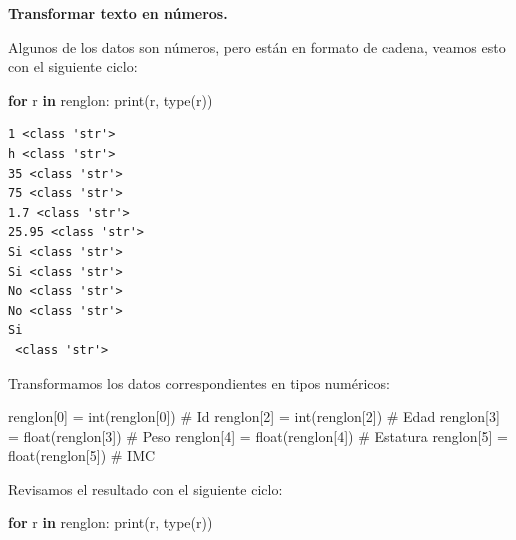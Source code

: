\documentclass[
  spanish,
  letterpaper,
]{scrbook}
\newenvironment{Shaded}{\begin{snugshade}}{\end{snugshade}}
\newcommand{\BuiltInTok}[1]{\textcolor[rgb]{0.00,0.23,0.31}{#1}}
\newcommand{\CommentTok}[1]{\textcolor[rgb]{0.37,0.37,0.37}{#1}}
\newcommand{\ControlFlowTok}[1]{\textcolor[rgb]{0.00,0.23,0.31}{\textbf{#1}}}
\newcommand{\DecValTok}[1]{\textcolor[rgb]{0.68,0.00,0.00}{#1}}
\newcommand{\KeywordTok}[1]{\textcolor[rgb]{0.00,0.23,0.31}{\textbf{#1}}}
\newcommand{\NormalTok}[1]{\textcolor[rgb]{0.00,0.23,0.31}{#1}}
\newcommand{\OperatorTok}[1]{\textcolor[rgb]{0.37,0.37,0.37}{#1}}
\theoremstyle{definition}
\theoremstyle{remark}
\begin{document}
\textbf{Transformar texto en números.}

Algunos de los datos son números, pero están en formato de cadena,
veamos esto con el siguiente ciclo:

\begin{Shaded}
\begin{Highlighting}[]
\ControlFlowTok{for}\NormalTok{ r }\KeywordTok{in}\NormalTok{ renglon:}
    \BuiltInTok{print}\NormalTok{(r, }\BuiltInTok{type}\NormalTok{(r))}
\end{Highlighting}
\end{Shaded}

\begin{verbatim}
1 <class 'str'>
h <class 'str'>
35 <class 'str'>
75 <class 'str'>
1.7 <class 'str'>
25.95 <class 'str'>
Si <class 'str'>
Si <class 'str'>
No <class 'str'>
No <class 'str'>
Si
 <class 'str'>
\end{verbatim}

Transformamos los datos correspondientes en tipos numéricos:

\begin{Shaded}
\begin{Highlighting}[]
\NormalTok{renglon[}\DecValTok{0}\NormalTok{] }\OperatorTok{=} \BuiltInTok{int}\NormalTok{(renglon[}\DecValTok{0}\NormalTok{])   }\CommentTok{\# Id}
\NormalTok{renglon[}\DecValTok{2}\NormalTok{] }\OperatorTok{=} \BuiltInTok{int}\NormalTok{(renglon[}\DecValTok{2}\NormalTok{])   }\CommentTok{\# Edad}
\NormalTok{renglon[}\DecValTok{3}\NormalTok{] }\OperatorTok{=} \BuiltInTok{float}\NormalTok{(renglon[}\DecValTok{3}\NormalTok{]) }\CommentTok{\# Peso}
\NormalTok{renglon[}\DecValTok{4}\NormalTok{] }\OperatorTok{=} \BuiltInTok{float}\NormalTok{(renglon[}\DecValTok{4}\NormalTok{]) }\CommentTok{\# Estatura}
\NormalTok{renglon[}\DecValTok{5}\NormalTok{] }\OperatorTok{=} \BuiltInTok{float}\NormalTok{(renglon[}\DecValTok{5}\NormalTok{]) }\CommentTok{\# IMC}
\end{Highlighting}
\end{Shaded}

Revisamos el resultado con el siguiente ciclo:

\begin{Shaded}
\begin{Highlighting}[]
\ControlFlowTok{for}\NormalTok{ r }\KeywordTok{in}\NormalTok{ renglon:}
    \BuiltInTok{print}\NormalTok{(r, }\BuiltInTok{type}\NormalTok{(r))}
\end{Highlighting}
\end{Shaded}
\end{document}
